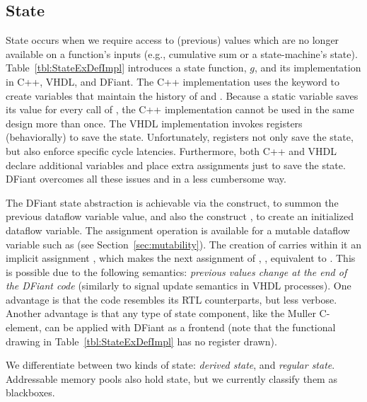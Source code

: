 \subsection{State}
State occurs when we require access to (previous) values which are no longer available on a function's inputs (e.g., cumulative sum or a state-machine's state). Table~\ref{tbl:StateExDefImpl} introduces a state function, $g$, and its implementation in C++, VHDL, and DFiant. The C++ implementation uses the  keyword to create variables that maintain the history of  and . Because a static variable saves its value for every call of , the C++ implementation cannot be used in the same design more than once. The VHDL implementation invokes registers (behaviorally) to save the state. Unfortunately, registers not only save the state, but also enforce specific cycle latencies. Furthermore, both C++ and VHDL declare additional variables and place extra assignments just to save the state. DFiant overcomes all these issues and in a less cumbersome way.

The DFiant state abstraction is achievable via the  construct, to summon the previous dataflow variable value, and also the construct , to create an initialized dataflow variable. The \code{:=} assignment operation is available for a mutable dataflow variable such as  (see Section~\ref{sec:mutability}). The creation of  carries within it an implicit assignment , which makes the next assignment of , , equivalent to . This is possible due to the following semantics: \textit{previous values change at the end of the DFiant code} (similarly to signal update semantics in VHDL processes). One advantage is that the code resembles its RTL counterparts, but less verbose. Another advantage is that any type of state component, like the Muller C-element\cite{muller1957theory}, can be applied with DFiant as a frontend (note that the functional drawing in Table~\ref{tbl:StateExDefImpl} has no register drawn).


We differentiate between two kinds of state: \textit{derived state}, and \textit{regular state}. Addressable memory pools also hold state, but we currently classify them as blackboxes. %

